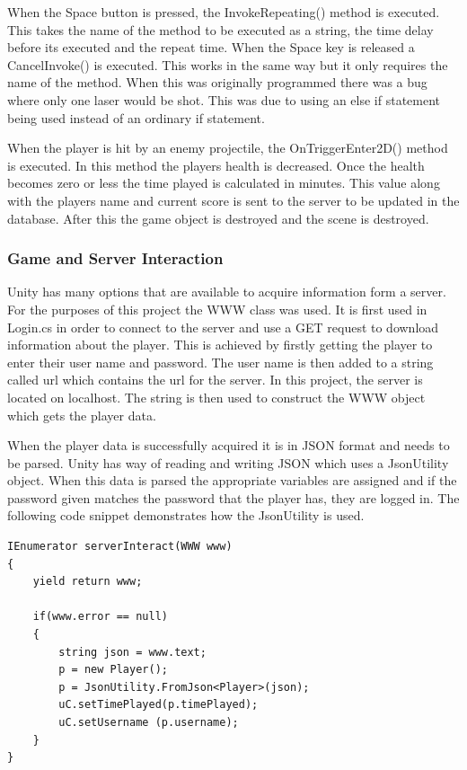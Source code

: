 \documentclass[12pt]{article}
\begin{document}
When the Space button is pressed, the InvokeRepeating() method is executed. This takes the name of the method to be executed as a string, the time delay before its executed and the repeat time. When the Space key is released a CancelInvoke() is executed. This works in the same way but it only requires the name of the method. When this was originally programmed there was a bug where only one laser would be shot. This was due to using an else if statement being used instead of an ordinary if statement. 

When the player is hit by an enemy projectile, the OnTriggerEnter2D() method is executed. In this method the players health is decreased. Once the health becomes zero or less the time played is calculated in minutes. This value along with the players name and current score is sent to the server to be updated in the database. After this the game object is destroyed and the scene is destroyed. 

\subsubsection{Game and Server Interaction}
Unity has many options that are available to acquire information form a server. For the purposes of this project the WWW class was used. It is first used in Login.cs in order to connect to the server and use a GET request to download information about the player. This is achieved by firstly getting the player to enter their user name and password. The user name is then added to a string called url which contains the url for the server. In this project, the server is located on localhost. The string is then used to construct the WWW object which gets the player data.

When the player data is successfully acquired it is in JSON format and needs to be parsed. Unity has way of reading and writing JSON which uses a JsonUtility object. When this data is parsed the appropriate variables are assigned and if the password given matches the password that the player has, they are logged in. The following code snippet demonstrates how the JsonUtility is used. 

\begin{lstlisting}
IEnumerator serverInteract(WWW www)
{
	yield return www;

	if(www.error == null)
	{
		string json = www.text;
		p = new Player();
		p = JsonUtility.FromJson<Player>(json);
		uC.setTimePlayed(p.timePlayed);
		uC.setUsername (p.username);
	}
}
\end{lstlisting}
\end{document}
